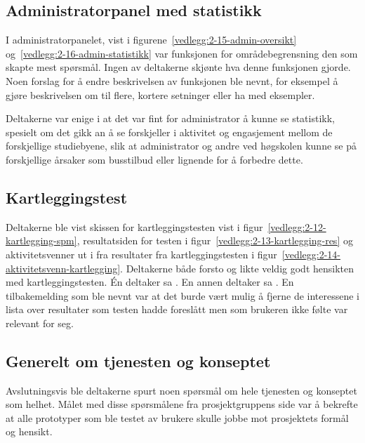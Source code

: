 \subsection{Administratorpanel med statistikk}

I administratorpanelet, vist i figurene~\ref{vedlegg:2-15-admin-oversikt} og~\ref{vedlegg:2-16-admin-statistikk} var funksjonen for områdebegrensning den som skapte mest spørsmål. Ingen av deltakerne skjønte hva denne funksjonen gjorde. Noen forslag for å endre beskrivelsen av funksjonen ble nevnt, for eksempel å gjøre beskrivelsen om til flere, kortere setninger eller ha med eksempler.

Deltakerne var enige i at det var fint for administrator å kunne se statistikk, spesielt om det gikk an å se forskjeller i aktivitet og engasjement mellom de forskjellige studiebyene, slik at administrator og andre ved høgskolen kunne se på forskjellige årsaker som busstilbud eller lignende for å forbedre dette.


\subsection{Kartleggingstest}

Deltakerne ble vist skissen for kartleggingstesten vist i figur~\ref{vedlegg:2-12-kartlegging-spm}, resultatsiden for testen i figur~\ref{vedlegg:2-13-kartlegging-res} og aktivitetsvenner ut i fra resultater fra kartleggingstesten i figur~\ref{vedlegg:2-14-aktivitetsvenn-kartlegging}. Deltakerne både forsto og likte veldig godt hensikten med kartleggingstesten. Én deltaker sa . En annen deltaker sa . En tilbakemelding som ble nevnt var at det burde vært mulig å fjerne de interessene i lista over resultater som testen hadde foreslått men som brukeren ikke følte var relevant for seg.


\subsection{Generelt om tjenesten og konseptet}

Avslutningsvis ble deltakerne spurt noen spørsmål om hele tjenesten og konseptet som helhet. Målet med disse spørsmålene fra prosjektgruppens side var å bekrefte at alle prototyper som ble testet av brukere skulle jobbe mot prosjektets formål og hensikt.

